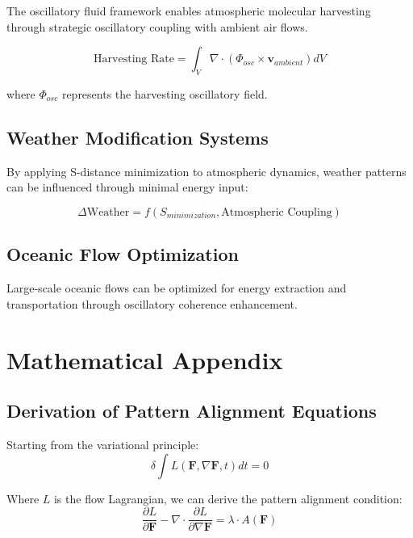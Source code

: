 \documentclass[12pt,a4paper]{article}
\begin{document}
The oscillatory fluid framework enables atmospheric molecular harvesting through strategic oscillatory coupling with ambient air flows.

\begin{equation}
\text{Harvesting Rate} = \int_V \nabla \cdot (\Phi_{osc} \times \mathbf{v}_{ambient}) dV
\end{equation}

where $\Phi_{osc}$ represents the harvesting oscillatory field.

\subsection{Weather Modification Systems}

By applying S-distance minimization to atmospheric dynamics, weather patterns can be influenced through minimal energy input:

\begin{equation}
\Delta \text{Weather} = f(S_{minimization}, \text{Atmospheric Coupling})
\end{equation}

\subsection{Oceanic Flow Optimization}

Large-scale oceanic flows can be optimized for energy extraction and transportation through oscillatory coherence enhancement.

\section{Mathematical Appendix}

\subsection{Derivation of Pattern Alignment Equations}

Starting from the variational principle:
\begin{equation}
\delta \int L(\mathbf{F}, \nabla \mathbf{F}, t) dt = 0
\end{equation}

Where $L$ is the flow Lagrangian, we can derive the pattern alignment condition:
\begin{equation}
\frac{\partial L}{\partial \mathbf{F}} - \nabla \cdot \frac{\partial L}{\partial \nabla \mathbf{F}} = \lambda \cdot A(\mathbf{F})
\end{equation}
\end{document}
